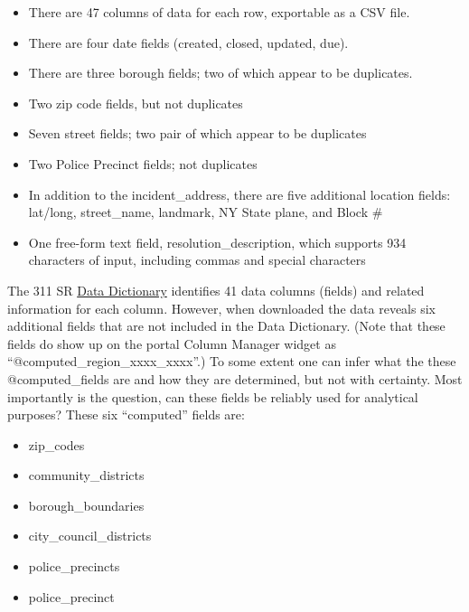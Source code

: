 \documentclass[12pt, titlepage]{article}
\begin{document}
\begin{itemize}
	\item There are 47 columns of data for each row, exportable as a CSV file.
	
	\item There are four date fields (created, closed, updated, due).
	
	\item There are three borough fields; two of which appear to be duplicates.
	
	\item Two zip code fields, but not duplicates
	
	\item Seven street fields; two pair of which appear to be duplicates
	
	\item Two Police Precinct fields; not duplicates
	
	\item In addition to the incident\_address, there are five additional location fields: 
	lat/long, street\_name, landmark, NY State plane, and Block \#
	
	\item One free-form text field, resolution\_description, which 
	supports 934 characters of input, including commas and special characters
\end{itemize}

The 311 SR \href{https://data.cityofnewyork.us/api/views/erm2-nwe9/files/b372b884-f86a-453b-ba16-1fe06ce9d212?download=true&filename=311_ServiceRequest_2010-Present_DataDictionary_Updated_2023.xlsx}{Data Dictionary}
 identifies 41 data columns (fields) and related information 
 for each column. However, when downloaded the data reveals 
 six additional fields that are not included in the Data Dictionary. 
(Note that these fields do show up on the portal Column Manager widget
 as ``@computed\_region\_xxxx\_xxxx''.) To some extent one can infer 
 what the these @computed\_fields are and how they are determined, but
 not with certainty. Most importantly is the question, can these fields be reliably 
 used for analytical purposes?  These six ``computed'' fields are:

\begin{itemize}
	\item zip\_codes
	
	\item community\_districts
	
	\item borough\_boundaries
	
	\item city\_council\_districts
	
	\item police\_precincts
	
	\item police\_precinct 
\end{itemize}	
\end{document}
